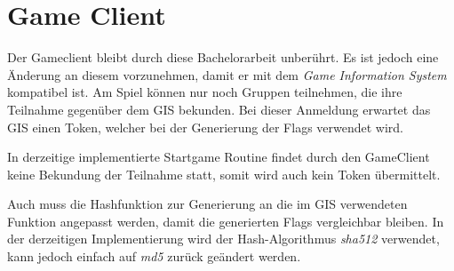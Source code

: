 \section{Game Client} \label{sec:Game_Client}
Der Gameclient bleibt durch diese Bachelorarbeit unberührt. Es ist jedoch eine Änderung an diesem vorzunehmen, damit er mit dem \textit{Game Information System} kompatibel ist.
Am Spiel können nur noch Gruppen teilnehmen, die ihre Teilnahme gegenüber dem GIS bekunden. Bei dieser Anmeldung erwartet das GIS einen Token, welcher bei der Generierung der Flags verwendet wird. 

In derzeitige implementierte Startgame Routine findet durch den GameClient keine Bekundung der Teilnahme statt, somit wird auch kein Token übermittelt.

Auch muss die Hashfunktion zur Generierung an die im GIS verwendeten Funktion angepasst werden, damit die generierten Flags vergleichbar bleiben. In der derzeitigen Implementierung wird der Hash-Algorithmus \textit{sha512} verwendet, kann jedoch einfach auf \textit{md5} zurück geändert werden.